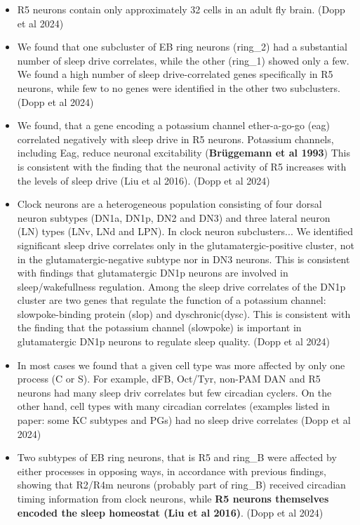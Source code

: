 \documentclass[11pt]{article}
\begin{document}
\begin{itemize}
    \item R5 neurons contain only approximately 32 cells in an adult fly brain.
    (Dopp et al 2024)

    \item We found that one subcluster of EB ring neurons (ring\_2) had a substantial number of sleep drive correlates, while the
    other (ring\_1) showed only a few. We found a high number of sleep drive-correlated genes specifically in R5 neurons,
    while few to no genes were identified in the other two subclusters.
    (Dopp et al 2024)

    \item We found, that a gene encoding a potassium channel ether-a-go-go (eag) correlated negatively with sleep drive in R5 neurons.
    Potassium channels, including Eag, reduce neuronal excitability (\textbf{Brüggemann et al 1993})
    This is consistent with the finding that the neuronal activity of R5 increases with the levels of sleep drive
    (Liu et al 2016).
    (Dopp et al 2024)

    \item Clock neurons are a heterogeneous population consisting of four dorsal neuron subtypes (DN1a, DN1p, DN2 and DN3)
    and three lateral neuron (LN) types (LNv, LNd and LPN).
    In clock neuron subclusters... We identified significant sleep drive correlates only in the glutamatergic-positive
    cluster, not in the glutamatergic-negative subtype nor in DN3 neurons. This is consistent with findings that
    glutamatergic DN1p neurons are involved in sleep/wakefullness regulation. Among the sleep drive correlates of the DN1p cluster are
    two genes that regulate the function of a potassium channel: slowpoke-binding protein (slop) and dyschronic(dysc).
    This is consistent with the finding that the potassium channel (slowpoke) is important in glutamatergic DN1p neurons to regulate
    sleep quality.
    (Dopp et al 2024)

    \item In most cases we found that a given cell type was more affected by only one process (C or S). For example,
    dFB, Oct/Tyr, non-PAM DAN and R5 neurons had many sleep driv correlates but few circadian cyclers. On the
    other hand, cell types with many circadian correlates (examples listed in paper: some KC subtypes and PGs) had
    no sleep drive correlates
    (Dopp et al 2024)

    \item Two subtypes of EB ring neurons, that is R5 and ring\_B were affected by either processes in opposing ways, in
    accordance with previous findings, showing that R2/R4m neurons (probably part of ring\_B) received circadian timing
    information from clock neurons, while \textbf{R5 neurons themselves encoded the sleep homeostat (Liu et al 2016)}.
    (Dopp et al 2024)


\end{itemize}
\end{document}
